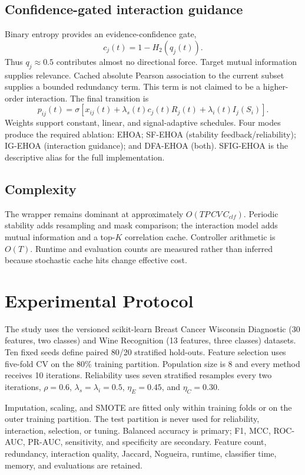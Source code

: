 \documentclass[11pt]{article}
\begin{document}
\subsection{Confidence-gated interaction guidance}
Binary entropy provides an evidence-confidence gate,
\begin{equation}
 c_j(t)=1-H_2(q_j(t)).
\end{equation}
Thus $q_j\approx0.5$ contributes almost no directional force. Target mutual
information supplies relevance. Cached absolute Pearson association to the
current subset supplies a bounded redundancy term. This term is not claimed to
be a higher-order interaction. The final transition is
\begin{equation}
 p_{ij}(t)=\sigma\left[x_{ij}(t)+\lambda_s(t)c_j(t)R_j(t)
 +\lambda_i(t)I_j(S_i)\right].
\end{equation}
Weights support constant, linear, and signal-adaptive schedules. Four modes
produce the required ablation: EHOA; SF-EHOA (stability feedback/reliability);
IG-EHOA (interaction guidance); and DFA-EHOA (both). SFIG-EHOA is the
descriptive alias for the full implementation.

\subsection{Complexity}
The wrapper remains dominant at approximately
$O(TP\,CV\,C_{clf})$. Periodic stability adds resampling and mask comparison;
the interaction model adds mutual information and a top-$K$ correlation cache.
Controller arithmetic is $O(T)$. Runtime and evaluation counts are measured
rather than inferred because stochastic cache hits change effective cost.

\section{Experimental Protocol}
The study uses the versioned scikit-learn Breast Cancer Wisconsin Diagnostic
(30 features, two classes) and Wine Recognition (13 features, three classes)
datasets. Ten fixed seeds define paired 80/20 stratified hold-outs. Feature
selection uses five-fold CV on the 80\% training partition. Population size is
8 and every method receives 10 iterations. Reliability uses seven stratified
resamples every two iterations, $\rho=0.6$, $\lambda_s=\lambda_i=0.5$,
$\eta_E=0.45$, and $\eta_C=0.30$.

Imputation, scaling, and SMOTE \cite{chawla2002smote} are fitted only within
training folds or on the outer training partition. The test partition is never
used for reliability, interaction, selection, or tuning. Balanced accuracy is
primary; F1, MCC, ROC-AUC, PR-AUC, sensitivity, and specificity are secondary.
Feature count, redundancy, interaction quality, Jaccard, Nogueira, runtime,
classifier time, memory, and evaluations are retained.
\end{document}
